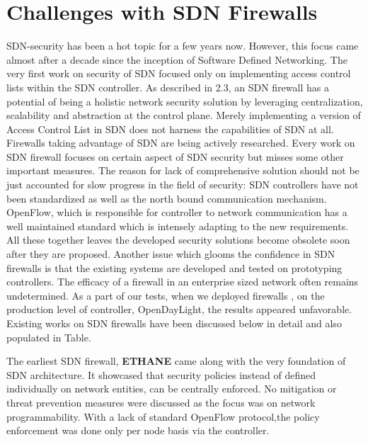 \section{Challenges with SDN Firewalls}
SDN-security has been a hot topic for a few years now. However, this focus came almost after a decade since the inception of Software Defined Networking. The very first \cite{ETHANE} work on security of SDN focused only on implementing access control lists within the SDN controller. As described in 2.3, an SDN firewall has a potential of being a holistic network security solution by leveraging centralization, scalability and abstraction at the control plane. Merely implementing a version of Access Control List \cite{FWOSDN} in SDN does not harness the capabilities of SDN at all. Firewalls taking advantage of SDN are being actively researched. Every work on SDN firewall focuses on certain aspect of SDN security but misses some other important measures. The reason for lack of comprehensive solution should not be just accounted for slow progress in the field of security: SDN controllers have not been standardized as well as the north bound communication mechanism. OpenFlow, which is responsible for controller to network communication has a well maintained standard which is intensely adapting to the new requirements. All these together leaves the developed security solutions become obsolete soon after they are proposed. Another issue which glooms the confidence in SDN firewalls is that the existing systems are developed and tested on prototyping controllers. The efficacy of a firewall in an enterprise sized network often remains undetermined. As a part of our tests, when we deployed firewalls \cite{FLOWGUARD}, \cite{SEFLOOD} on the production level of controller, OpenDayLight\cite{ODL}, the results appeared unfavorable. Existing works on SDN firewalls have been discussed below in detail and also populated in Table.


The earliest SDN firewall, \textbf{ETHANE} \cite{ETHANE} came along with the very foundation of SDN architecture. It showcased that security policies instead of defined individually on network entities, can be centrally enforced. No mitigation or threat prevention measures were discussed as the focus was on network programmability. With a lack of standard OpenFlow protocol,the policy enforcement was done only per node basis via the controller.  

